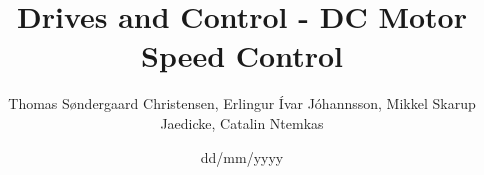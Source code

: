 \documentclass[a4paper,10pt]{article}
\title{Drives and Control - DC Motor Speed Control}
\author{Thomas Søndergaard Christensen, Erlingur Ívar Jóhannsson, Mikkel Skarup Jaedicke, Catalin Ntemkas}
\date{dd/mm/yyyy}
\begin{document}



\newpage
\tableofcontents
\newpage
\listoffigures
\listoftables
\listoftodos
\clearpage
\newpage

\newpage

\newpage

\newpage

\end{document}
